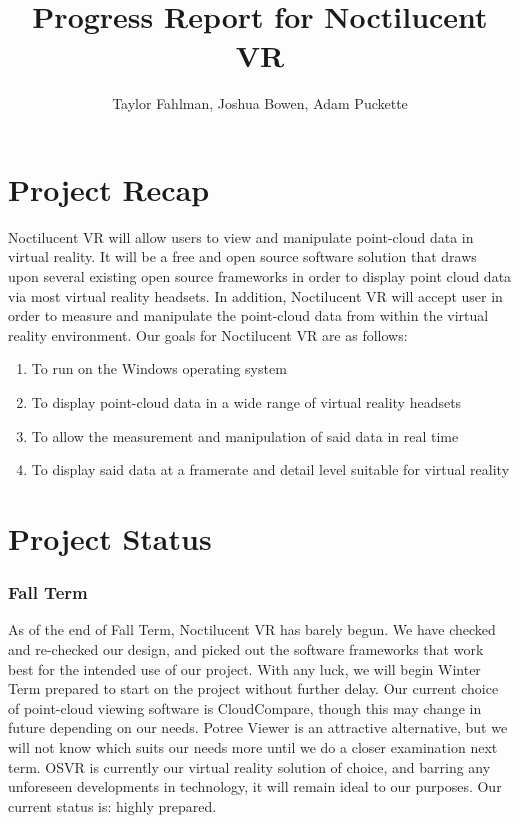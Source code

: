 \documentclass[draftclsnofoot,onecolumn]{IEEEtran}
\begin{document}
\title {Progress Report for Noctilucent VR}
\author {Taylor Fahlman, Joshua Bowen, Adam Puckette}

\maketitle

\section{Project Recap}

Noctilucent VR will allow users to view and manipulate point-cloud data in virtual reality. 
It will be a free and open source software solution that draws upon several existing open source frameworks in order to display point cloud data via most virtual reality headsets. 
In addition, Noctilucent VR will accept user in order to measure and manipulate the point-cloud data from within the virtual reality environment. 
Our goals for Noctilucent VR are as follows:

\begin{enumerate}
\item To run on the Windows operating system
\item To display point-cloud data in a wide range of virtual reality headsets
\item To allow the measurement and manipulation of said data in real time
\item To display said data at a framerate and detail level suitable for virtual reality
\end{enumerate}

\section{Project Status}

\subsubsection{Fall Term}

As of the end of Fall Term, Noctilucent VR has barely begun. 
We have checked and re-checked our design, and picked out the software frameworks that work best for the intended use of our project. 
With any luck, we will begin Winter Term prepared to start on the project without further delay. 
Our current choice of point-cloud viewing software is CloudCompare, though this may change in future depending on our needs. 
Potree Viewer is an attractive alternative, but we will not know which suits our needs more until we do a closer examination next term. 
OSVR is currently our virtual reality solution of choice, and barring any unforeseen developments in technology, it will remain ideal to our purposes. 
Our current status is: highly prepared.
\end{document}
